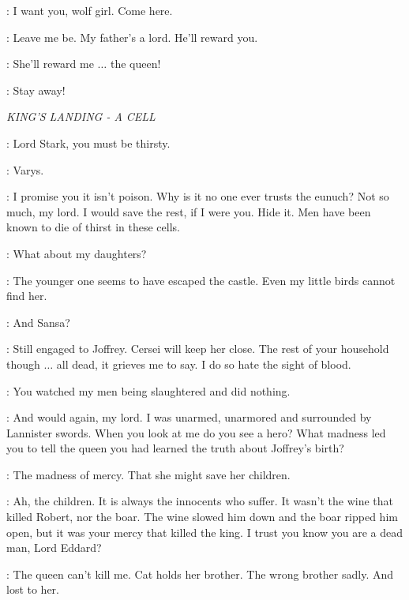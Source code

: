 \BOY: I want you, wolf girl. Come here. 

\ARYA: Leave me be. My father's a lord. He'll reward you. 

\BOY: She'll reward me $\ldots$ the queen! 

\ARYA: Stay away! 



\scene

\textit{KING'S LANDING - A CELL} 


\VARYS: Lord Stark, you must be thirsty. 

\NED: Varys. 


\VARYS: I promise you it isn't poison. Why is it no one ever trusts the eunuch?
 Not so much, my lord. I would save the rest, if I were you. Hide it. Men have been known to die of thirst in these cells. 

\NED: What about my daughters? 

\VARYS: The younger one seems to have escaped the castle. Even my little birds cannot find her. 

\NED: And Sansa? 

\VARYS: Still engaged to Joffrey. Cersei will keep her close. The rest of your household though $\ldots$ all dead, it grieves me to say. I do so hate the sight of blood. 

\NED: You watched my men being slaughtered and did nothing. 

\VARYS: And would again, my lord. I was unarmed, unarmored and surrounded by Lannister swords. When you look at me do you see a hero? What madness led you to tell the queen you had learned the truth about Joffrey's birth? 

\NED: The madness of mercy. That she might save her children. 

\VARYS: Ah, the children. It is always the innocents who suffer. It wasn't the wine that killed Robert, nor the boar. The wine slowed him down and the boar ripped him open, but it was your mercy that killed the king. I trust you know you are a dead man, Lord Eddard? 

\NED: The queen can't kill me. Cat holds her brother. The wrong brother sadly. And lost to her. 

